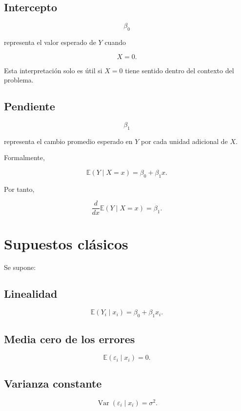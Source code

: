 \documentclass[
  spanish,
  11pt,
  letterpaper,
  DIV=11,
  numbers=noendperiod]{scrreprt}
\theoremstyle{definition}
\theoremstyle{plain}
\theoremstyle{definition}
\theoremstyle{remark}
\begin{document}
\subsection{Intercepto}\label{intercepto}

\[
\beta_0
\]

representa el valor esperado de \(Y\) cuando

\[
X=0.
\]

Esta interpretación solo es útil si \(X=0\) tiene sentido dentro del
contexto del problema.

\subsection{Pendiente}\label{pendiente}

\[
\beta_1
\]

representa el cambio promedio esperado en \(Y\) por cada unidad
adicional de \(X\).

Formalmente,

\[
\mathbb{E}(Y\mid X=x)
=
\beta_0+\beta_1x.
\]

Por tanto,

\[
\frac{d}{dx}
\mathbb{E}(Y\mid X=x)
=
\beta_1.
\]

\section{Supuestos clásicos}\label{supuestos-cluxe1sicos}

Se supone:

\subsection{Linealidad}\label{linealidad}

\[
\mathbb{E}(Y_i\mid x_i)
=
\beta_0+\beta_1x_i.
\]

\subsection{Media cero de los errores}\label{media-cero-de-los-errores}

\[
\mathbb{E}(\varepsilon_i\mid x_i)=0.
\]

\subsection{Varianza constante}\label{varianza-constante}

\[
\operatorname{Var}(\varepsilon_i\mid x_i)
=
\sigma^2.
\]
\end{document}
